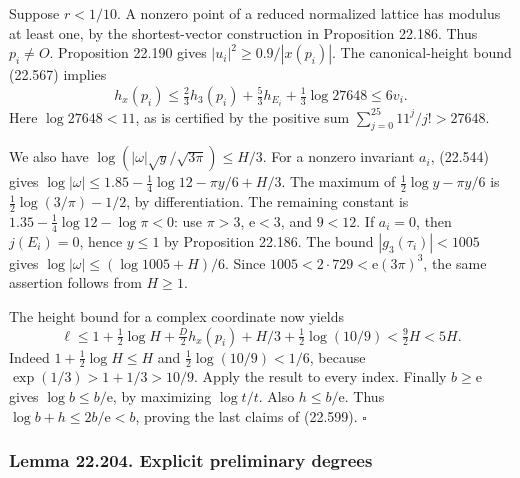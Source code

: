 \documentclass[
  11pt,
  a4paper,
]{article}
\begin{document}
Suppose \(r<1/10\). A nonzero point of a reduced normalized lattice has
modulus at least one, by the shortest-vector construction in Proposition
22.186. Thus \(p_i\ne O\). Proposition 22.190 gives
\(|u_i|^2\ge0.9/|x(p_i)|\). The canonical-height bound (22.567) implies
\[
 h_x(p_i)\le\tfrac23\widehat h_3(p_i)
                +\tfrac53h_{E_i}+\tfrac13\log27648\le6v_i.
 \tag{22.600}
\] Here \(\log27648<11\), as is certified by the positive sum
\(\sum_{j=0}^{25}11^j/j!>27648\).

We also have \(\log(|\omega|\sqrt y/\sqrt{3\pi})\le H/3\). For a nonzero
invariant \(a_i\), (22.544) gives
\(\log|\omega|\le1.85-\tfrac14\log12-\pi y/6+H/3\). The maximum of
\(\tfrac12\log y-\pi y/6\) is \(\tfrac12\log(3/\pi)-1/2\), by
differentiation. The remaining constant is
\(1.35-\tfrac14\log12-\log\pi<0\): use \(\pi>3\), \(\mathrm e<3\), and
\(9<12\). If \(a_i=0\), then \(j(E_i)=0\), hence \(y\le1\) by
Proposition 22.186. The bound \(|g_3(\tau_i)|<1005\) gives
\(\log|\omega|\le(\log1005+H)/6\). Since
\(1005<2\cdot729<\mathrm e(3\pi)^3\), the same assertion follows from
\(H\ge1\).

The height bound for a complex coordinate now yields \[
 \ell\le1+\tfrac12\log H+\tfrac D2h_x(p_i)
              +H/3+\tfrac12\log(10/9)<\tfrac92H<5H.
 \tag{22.601}
\] Indeed \(1+\tfrac12\log H\le H\) and \(\tfrac12\log(10/9)<1/6\),
because \(\exp(1/3)>1+1/3>10/9\). Apply the result to every index.
Finally \(b\ge\mathrm e\) gives \(\log b\le b/\mathrm e\), by maximizing
\(\log t/t\). Also \(h\le b/\mathrm e\). Thus
\(\log b+h\le2b/\mathrm e<b\), proving the last claims of (22.599).
\(\square\)

\subsubsection{Lemma 22.204. Explicit preliminary
degrees}\label{lemma-22.204.-explicit-preliminary-degrees}
\end{document}

